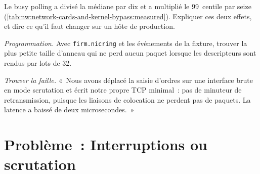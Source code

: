 \begin{exercise}[$\star\star$]\label{exo:nw:network-cards-and-kernel-bypass:6}
Le busy polling a divisé la médiane par dix et a multiplié le 99~centile par seize 
(\cref{tab:nw:network-cards-and-kernel-bypass:measured}). Expliquer ces deux effets, et dire ce qu'il faut changer sur un hôte de production.
\end{exercise}

\begin{exercise}[$\star\star\star$]\label{exo:nw:network-cards-and-kernel-bypass:7}
\emph{Programmation.} Avec \texttt{firm.nicring} et les événements de la fixture, trouver la plus petite taille d'anneau qui ne perd aucun paquet lorsque les descripteurs sont
rendus par lots de 32.
\end{exercise}

\begin{exercise}[$\star\star\star$]\label{exo:nw:network-cards-and-kernel-bypass:8}
\emph{Trouver la faille.} «~Nous avons déplacé la saisie d'ordres sur une interface brute en mode scrutation et écrit notre propre TCP minimal~: pas de minuteur de retransmission, puisque
les liaisons de colocation ne perdent pas de paquets. La latence a baissé de deux microsecondes.~»
\end{exercise}

\section{Problème~: Interruptions ou scrutation}

